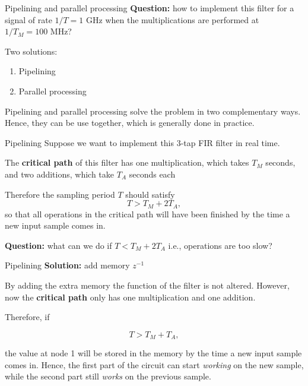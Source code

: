 \documentclass[10pt, handout]{beamer}
\begin{document}
\begin{frame}{Pipelining and parallel processing}
\textbf{Question:} how to implement this filter for a signal of rate $1/T = 1$ GHz when the multiplications are performed at $1/T_M = 100$ MHz?

\begin{center}
	\resizebox{0.9\textwidth}{!}{}
\end{center}

Two solutions:
\begin{enumerate}
	\item Pipelining
	\item Parallel processing
\end{enumerate}

Pipelining and parallel processing solve the problem in two complementary ways. Hence, they can be use together, which is generally done in practice. 

\end{frame}

\begin{frame}{Pipelining}
Suppose we want to implement this 3-tap FIR filter in real time. 

\begin{center}
	\resizebox{0.7\textwidth}{!}{}
\end{center}

The {\color{red2} \textbf{critical path}} of this filter has one multiplication, which takes $T_M$ seconds, and two additions, which take $T_A$ seconds each

Therefore the sampling period $T$ should satisfy
\begin{equation*}
T > T_M + 2T_A,
\end{equation*}
so that all operations in the critical path will have been finished by the time a new input sample comes in.

\pause
\textbf{Question:} what can we do if $T < T_M + 2T_A$ i.e., operations are too slow? 
\end{frame}

\begin{frame}{Pipelining}
\textbf{Solution:} add memory $z^{-1}$
\begin{center}
	\def\PIPE{1}
	\resizebox{0.8\textwidth}{!}{}
\end{center}

By adding the extra memory the function of the filter is not altered. However, now the {\color{red2} \textbf{critical path}} only has one multiplication and one addition. 


Therefore, if

\begin{equation*}
T > T_M + T_A, 
\end{equation*}

the value at {\color{blue2} node 1} will be stored in the memory by the time a new input sample comes in. Hence, the first part of the circuit can start \textit{working} on the new sample, while the second part still \textit{works} on the previous sample.

\end{frame}
\end{document}
